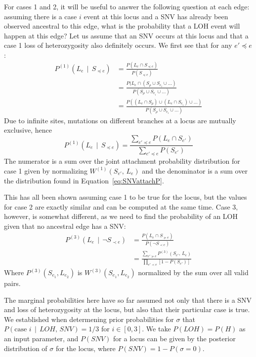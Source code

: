 \documentclass[../../main.tex]{subfiles}
\begin{document}
For cases 1 and 2, it will be useful to answer the following question at each edge: assuming there is a case $i$ event at this locus and a SNV has already been observed ancestral to this edge, what is the probability that a LOH event will happen at this edge?
Let us assume that an SNV occurs at this locus and that a case 1 loss of heterozygosity also definitely occurs.
We first see that for any $e'\preceq e$: 
\begin{align*}
    P^{(1)}(L_e\,\mid\,S_{\preceq e}) &= \frac{P(L_e\cap S_{\preceq e})}{P(S_{\preceq e})}\\
    &= \frac{P(L_e\cap(S_\rho \cup S_{e_i} \cup \dots)}{P(S_\rho \cup S_{e_i} \cup \dots)}\\
    &= \frac{P((L_e\cap S_\rho) \cup (L_e\cap S_{e_i}) \cup \dots)}{P(S_\rho \cup S_{e_i} \cup \dots)}
\end{align*}
Due to infinite sites, mutations on different branches at a locus are mutually exclusive, hence
\begin{equation*}
    P^{(1)}(L_e\,\mid\,S_{\preceq e}) = \frac{\sum_{e'\preceq e}P(L_e\cap S_{e'})}{\sum_{e'\preceq e}P(S_{e'})}
\end{equation*}
The numerator is a sum over the joint attachment probability distribution for case 1 given by normalizing $W^{(1)} (S_{e'},\,L_e)$ and the denominator is a sum over the distribution found in Equation~\ref{eq:SNVattachP}.

This has all been shown assuming case 1 to be true for the locus, but the values for case 2 are exactly similar and can be computed at the same time.
Case 3, however, is somewhat different, as we need to find the probability of an LOH given that no ancestral edge has a SNV:
\begin{align*}
    P^{(3)}(L_e\,\mid\,\neg S_{\prec e}) &= \frac{P(L_e\cap S_{\succeq e})}{P(\neg S_{\prec e})}\\
   &= \frac{\sum_{e'\succeq e}P^{(3)}(S_{e'},\,L_e)}{\prod_{e'\prec e}\left[1-P(S_{e'})\right]}
\end{align*}
Where $P^{(3)}(S_{e_1},L_{e_2})$ is $W^{(3)}(S_{e_1},L_{e_2})$ normalized by the sum over all valid pairs.

The marginal probabilities here have so far assumed not only that there is a SNV and loss of heterozygosity at the locus, but also that their particular case is true.
We established when determening prior probabilities for $\sigma$ that $P(\text{case }i\,\mid\,LOH,\,SNV) = 1/3$ for $i\in[0,3]$.
We take $P(LOH) = P(H)$ as an input parameter, and $P(SNV)$ for a locus can be given by the posterior distribution of $\sigma$ for the locus, where $P(SNV) = 1-P(\sigma=0)$.
\end{document}
